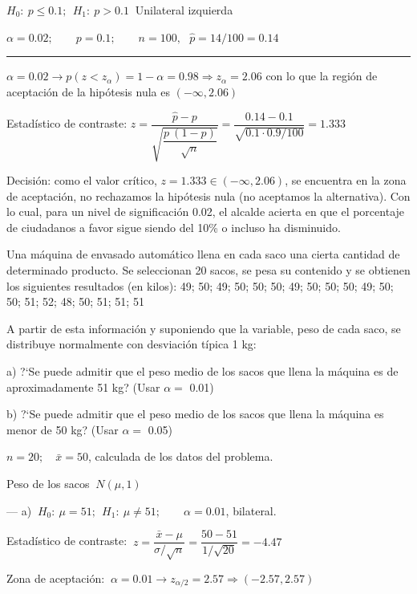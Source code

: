 $H_0:\ p\le 0.1 ;\ \ H_1: \ p>0.1\ $ Unilateral izquierda

$\alpha=0.02;\qquad p=0.1; \qquad n=100,\ \ \ \widehat p=14/100=0.14$

\rule{150pt}{0.1pt}

$\alpha=0.02 \to p(z<z_\alpha)=1-\alpha=0.98 \Rightarrow z_\alpha=2.06$ con lo que la región de aceptación de la hipótesis nula es $(-\infty,2.06)$

Estadístico de contraste: $z=\dfrac{\widehat p -p}{\sqrt{\dfrac{p\ (1-p)}{\sqrt{n}}}}=
\dfrac{0.14 - 0.1}{\sqrt{0.1 \cdot 0.9/100}}=1.333$

Decisión: como el valor crítico, $z=1.333 \in (-\infty, 2.06)$, se encuentra en la zona de aceptación, no rechazamos la hipótesis nula (no aceptamos la alternativa). Con lo cual, para un nivel de significación 0.02, el alcalde acierta en que el porcentaje de ciudadanos a favor sigue siendo del 10\% o incluso ha disminuido. 

\vspace{4mm}
\begin{ejemplo}
\begin{ejer}
	Una máquina de envasado automático llena en cada saco una cierta cantidad de determinado producto. Se seleccionan 20 sacos, se pesa su contenido y se obtienen los siguientes resultados (en kilos): 49; 50; 49; 50; 50; 50; 49; 50; 50; 50; 49; 50; 50; 51; 52; 48; 50; 51; 51; 51

A partir de esta información y suponiendo que la variable, peso de cada saco, se distribuye normalmente con desviación típica 1 kg:

a) ?`Se puede admitir que el peso medio de los sacos que llena la máquina es de aproximadamente 51 kg? (Usar $\alpha=$ 0.01)

b) ?`Se puede admitir que el peso medio de los sacos que llena la máquina es menor de 50 kg? (Usar $\alpha=$ 0.05)
\end{ejer}
\end{ejemplo}

$n=20;\quad \bar x=50$, calculada de los datos del problema.

Peso de los sacos $	\ N(\mu, 1)$

--- a) $\ H_0: \ \mu=51;\ \ H_1:\ \mu \neq 51;\qquad \alpha=0.01$, bilateral.

Estadístico de contraste: $\ z=\dfrac{\bar x - \mu}{\sigma/\sqrt{n}}=\dfrac{50-51}{1/\sqrt{20}}=-4.47$

Zona de aceptación: $\ \alpha=0.01 \to z_{\alpha/2}=2.57 \Rightarrow (-2.57,2.57)$

